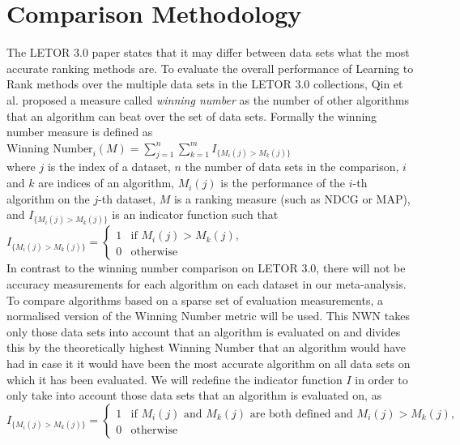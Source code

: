 \section{Comparison Methodology}
The LETOR 3.0 paper \cite{Qin2010} states that it may differ between data sets what the most accurate ranking methods are. To evaluate the overall performance of Learning to Rank methods over the multiple data sets in the LETOR 3.0 collections, Qin et al. \cite{Qin2010} proposed a measure called \emph{winning number} as the number of other algorithms that an algorithm can beat over the set of data sets. Formally the winning number measure is defined as\\

$\text{Winning Number}_i(M) = \sum\nolimits_{j=1}^n \sum\nolimits_{k=1}^m I_{\{M_i(j)>M_k(j)\}}$\\

where $j$ is the index of a dataset, $n$ the number of data sets in the comparison, $i$ and $k$ are indices of an algorithm, $M_i(j)$ is the performance of the $i$-th algorithm on the $j$-th dataset, $M$ is a ranking measure (such as \ac{NDCG} or \ac{MAP}), and $I_{\{M_i(j)>M_k(j)\}}$ is an indicator function such that\\

$I_{\{M_i(j)>M_k(j)\}} = \begin{cases}
1 & \text{if } M_i(j) > M_k(j), \\
0 & \text{otherwise}
\end{cases}$\\

In contrast to the winning number comparison on LETOR 3.0, there will not be accuracy measurements for each algorithm on each dataset in our meta-analysis. To compare algorithms based on a sparse set of evaluation measurements, a normalised version of the Winning Number metric will be used. This \ac{NWN} takes only those data sets into account that an algorithm is evaluated on and divides this by the theoretically highest Winning Number that an algorithm would have had in case it it would have been the most accurate algorithm on all data sets on which it has been evaluated. We will redefine the indicator function $I$ in order to only take into account those data sets that an algorithm is evaluated on, as \\

$I_{\{M_i(j)>M_k(j)\}} = \begin{cases}
1 & \text{if } M_i(j) \text{ and } M_k(j) \text{ are both defined and } M_i(j) > M_k(j), \\
0 & \text{otherwise}
\end{cases}$\\

